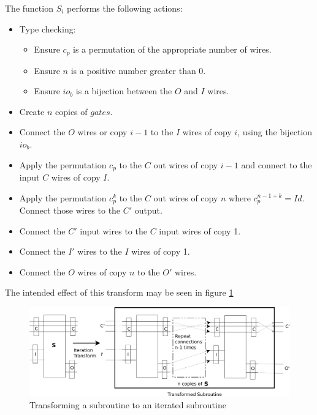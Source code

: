 The function $S_i$ performs the following actions:
\begin{itemize}
  \item Type checking:
  \begin{itemize}
    \item Ensure  $c_p$ is a permutation of the appropriate number of wires.
    \item Ensure $n$ is a positive number greater than 0.
    \item Ensure $io_b$ is a bijection between the $O$ and $I$ wires.
  \end{itemize}
  \item Create $n$ copies of $gates$.
  \item Connect the $O$ wires or copy $i-1$ to the $I$ wires of copy $i$,
  using the bijection $io_b$.
  \item Apply the permutation $c_p$ to the $C$ out wires of copy $i-1$
  and connect to the input $C$ wires of copy $I$.
  \item Apply the permutation $c_p^k$ to the $C$ out wires of copy $n$
  where $c_p^{n-1+k} = Id$. Connect those wires to the $C'$ output.
  \item Connect the $C'$ input wires to the $C$ input wires of copy 1.
  \item Connect the $I'$ wires to the $I$ wires of copy 1.
  \item Connect the $O$ wires of copy $n$ to the $O'$ wires.
\end{itemize}

The intended effect of this transform may be seen in figure
\ref{fig:transforming_a_subroutine_to_an_iterated_subroutine}
\begin{figure}[htbp]
  \centering
     \includegraphics[scale=.4]{diagrams/SubroutineIterationTransform.png}
   \caption{Transforming a subroutine to an iterated subroutine}
   \label{fig:transforming_a_subroutine_to_an_iterated_subroutine}
\end{figure}


